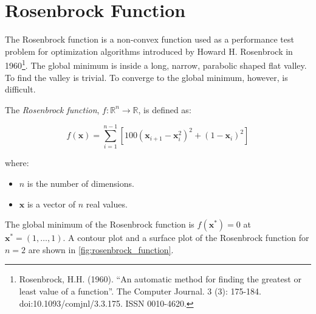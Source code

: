 \section{Rosenbrock Function}
\label{sec:rosenbrock_function}
  The Rosenbrock function is a non-convex function used as a performance test 
  problem for optimization algorithms introduced by Howard H. Rosenbrock in 
  1960\footnote{
    Rosenbrock, H.H. (1960). \enquote{An automatic method for finding the
    greatest or least value of a function}. The Computer Journal. 3 (3): 
    175-184. doi:10.1093/comjnl/3.3.175. ISSN 0010-4620.
  }. 
  The global minimum is inside a long, narrow, parabolic shaped flat valley.
  To find the valley is trivial.
  To converge to the global minimum, however, is difficult.

  \begin{definition}
    The \emph{Rosenbrock function}, \(f: \mathbb{R}^n \rightarrow \mathbb{R}\), 
    is defined as:

    \begin{equation}
      \label{eq:rosenbrock_function}
      f(\mathbf{x}) 
        = \sum_{i=1}^{n-1} \left[ 
          100 (\mathbf{x}_{i+1} - \mathbf{x}_i^2)^2 + (1 - \mathbf{x}_i)^2 
        \right]
    \end{equation}

    where:

    \begin{itemize}
      \item \(n\) is the number of dimensions.
      \item \(\mathbf{x}\) is a vector of \(n\) real values.
    \end{itemize}
  \end{definition}

  The global minimum of the Rosenbrock function is \(f(\mathbf{x}^*) = 0\) at
  \(\mathbf{x}^* = (1, \ldots, 1)\).
  A contour plot and a surface plot of the Rosenbrock function for \(n = 2\) are
  shown in \vref{fig:rosenbrock_function}.

